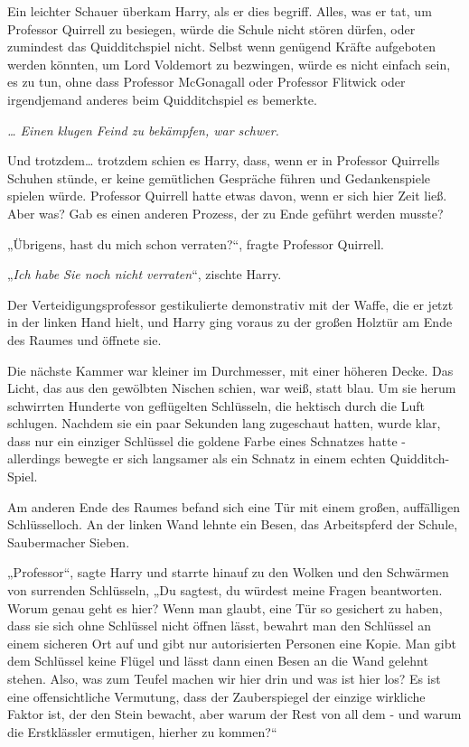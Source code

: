 {Ein leichter Schauer überkam Harry, als er dies begriff. Alles, was er tat, um Professor Quirrell zu besiegen, würde die Schule nicht stören dürfen, oder zumindest das Quidditchspiel nicht. Selbst wenn genügend Kräfte aufgeboten werden könnten, um Lord Voldemort zu bezwingen, würde es nicht einfach sein, es zu tun, ohne dass Professor McGonagall oder Professor Flitwick oder irgendjemand anderes beim Quidditchspiel es bemerkte.

\emph{… Einen klugen Feind zu bekämpfen, war schwer.}

Und trotzdem… trotzdem schien es Harry, dass, wenn er in Professor Quirrells Schuhen stünde, er keine gemütlichen Gespräche führen und Gedankenspiele spielen würde. Professor Quirrell hatte etwas davon, wenn er sich hier Zeit ließ. Aber was? Gab es einen anderen Prozess, der zu Ende geführt werden musste?

„Übrigens, hast du mich schon verraten?“, fragte Professor Quirrell.

„\emph{Ich habe Sie noch nicht verraten}“, zischte Harry.

Der Verteidigungsprofessor gestikulierte demonstrativ mit der Waffe, die er jetzt in der linken Hand hielt, und Harry ging voraus zu der großen Holztür am Ende des Raumes und öffnete sie.

Die nächste Kammer war kleiner im Durchmesser, mit einer höheren Decke. Das Licht, das aus den gewölbten Nischen schien, war weiß, statt blau. Um sie herum schwirrten Hunderte von geflügelten Schlüsseln, die hektisch durch die Luft schlugen. Nachdem sie ein paar Sekunden lang zugeschaut hatten, wurde klar, dass nur ein einziger Schlüssel die goldene Farbe eines Schnatzes hatte - allerdings bewegte er sich langsamer als ein Schnatz in einem echten Quidditch-Spiel.

Am anderen Ende des Raumes befand sich eine Tür mit einem großen, auffälligen Schlüsselloch. An der linken Wand lehnte ein Besen, das Arbeitspferd der Schule, Saubermacher Sieben.

„Professor“, sagte Harry und starrte hinauf zu den Wolken und den Schwärmen von surrenden Schlüsseln, „Du sagtest, du würdest meine Fragen beantworten. Worum genau geht es hier? Wenn man glaubt, eine Tür so gesichert zu haben, dass sie sich ohne Schlüssel nicht öffnen lässt, bewahrt man den Schlüssel an einem sicheren Ort auf und gibt nur autorisierten Personen eine Kopie. Man gibt dem Schlüssel keine Flügel und lässt dann einen Besen an die Wand gelehnt stehen. Also, was zum Teufel machen wir hier drin und was ist hier los? Es ist eine offensichtliche Vermutung, dass der Zauberspiegel der einzige wirkliche Faktor ist, der den Stein bewacht, aber warum der Rest von all dem - und warum die Erstklässler ermutigen, hierher zu kommen?“

}
